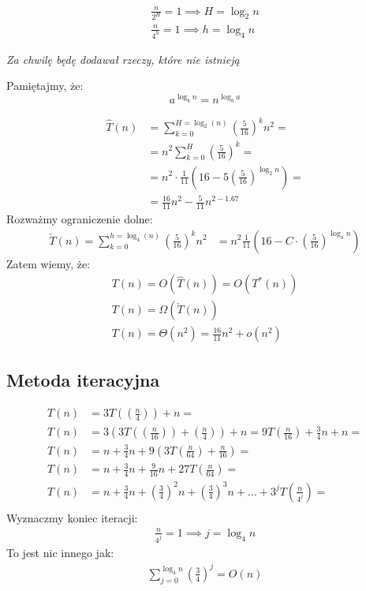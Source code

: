 \documentclass{article}
\begin{document}
\begin{align}
    \frac{n}{2^H} = 1 \implies H = \log_2 n\\
    \frac{n}{4^h} = 1 \implies h = \log_4 n
\end{align}

\vspace{1cm}

\noindent
\textit{Za chwilę będę dodawał rzeczy, które nie istnieją}

\vspace{1cm}

\noindent
Pamiętajmy, że:
\[
    a^{\log_b n} = n^{\log_b a}
\]

\begin{align}
    \hat{T}(n) &= \sum_{k=0}^{H=\log_2(n)} \left(\frac{5}{16}\right)^k n^2 =\\
    &= n^2 \sum_{k=0}^{H} \left(\frac{5}{16}\right)^k =\\
    &= n^2 \cdot \frac{1}{11} \left(16 - 5\left(\frac{5}{16}\right)^{\log_2 n}\right) =\\
    &= \frac{16}{11} n^2 - \frac{5}{11} n^{2-1.67}
\end{align}
Rozważmy ograniczenie dolne:
\begin{align}
    \check{T}(n) = \sum_{k=0}^{h=\log_4(n)} \left(\frac{5}{16}\right)^k n^2
    &= n^2 \frac{1}{11}\left(16 - C\cdot \left(\frac{5}{16}\right)^{\log_4 n}\right)
\end{align}
Zatem wiemy, że:
\begin{align}
    T(n) = O(\hat{T}(n)) = O(T^{*}(n))\\
    T(n) = \Omega(\check{T}(n))\\
    T(n) = \Theta(n^2) = \frac{16}{11} n^2 + o(n^2)
\end{align}

\subsection{Metoda iteracyjna}

\begin{align}
    T(n) &= 3T(\left(\frac{n}{4}\right)) + n =\\
    T(n) &= 3\left(3T\left(\left(\frac{n}{16}\right)\right) + \left(\frac{n}{4}\right)\right) + n = 9T\left(\frac{n}{16}\right) + \frac{3}{4} n + n =\\
    T(n) &= n + \frac{3}{4} n + 9\left(3T\left(\frac{n}{64}\right) + \frac{n}{16}\right) =\\
    T(n) &= n + \frac{3}{4} n + \frac{9}{16} n + 27T\left(\frac{n}{64}\right) =\\
    T(n) &= n + \frac{3}{4} n + \left(\frac{3}{4}\right)^2 n + \left(\frac{3}{4}\right)^3 n + \dots + 3^j T\left(\frac{n}{4^j}\right) =\\
\end{align}
Wyznaczmy koniec iteracji:
\begin{align}
    \frac{n}{4^j} = 1 \implies j = \log_4 n
\end{align}
To jest nic innego jak:
\begin{align}
    \sum_{j=0}^{\log_4 n} \left(\frac{3}{4}\right)^j = O(n)
\end{align}
\end{document}
